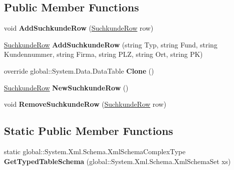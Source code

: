 \subsection*{Public Member Functions}
\begin{DoxyCompactItemize}
\item 
void {\bfseries Add\+Suchkunde\+Row} (\hyperlink{class_products_1_1_data_1_1ds_sage_1_1_suchkunde_row}{Suchkunde\+Row} row)\hypertarget{class_products_1_1_data_1_1ds_sage_1_1_suchkunde_data_table_a9b507c97784ecc77486250055d92f8f5}{}\label{class_products_1_1_data_1_1ds_sage_1_1_suchkunde_data_table_a9b507c97784ecc77486250055d92f8f5}

\item 
\hyperlink{class_products_1_1_data_1_1ds_sage_1_1_suchkunde_row}{Suchkunde\+Row} {\bfseries Add\+Suchkunde\+Row} (string Typ, string Fund, string Kundennummer, string Firma, string P\+LZ, string Ort, string PK)\hypertarget{class_products_1_1_data_1_1ds_sage_1_1_suchkunde_data_table_a2c5311a525c785afbbfb2a7a9ec6fa23}{}\label{class_products_1_1_data_1_1ds_sage_1_1_suchkunde_data_table_a2c5311a525c785afbbfb2a7a9ec6fa23}

\item 
override global\+::\+System.\+Data.\+Data\+Table {\bfseries Clone} ()\hypertarget{class_products_1_1_data_1_1ds_sage_1_1_suchkunde_data_table_aadc5fbbf3329ce71647c599be0a71d3b}{}\label{class_products_1_1_data_1_1ds_sage_1_1_suchkunde_data_table_aadc5fbbf3329ce71647c599be0a71d3b}

\item 
\hyperlink{class_products_1_1_data_1_1ds_sage_1_1_suchkunde_row}{Suchkunde\+Row} {\bfseries New\+Suchkunde\+Row} ()\hypertarget{class_products_1_1_data_1_1ds_sage_1_1_suchkunde_data_table_ab7a006a3b39bb8816c49da96a58dcb94}{}\label{class_products_1_1_data_1_1ds_sage_1_1_suchkunde_data_table_ab7a006a3b39bb8816c49da96a58dcb94}

\item 
void {\bfseries Remove\+Suchkunde\+Row} (\hyperlink{class_products_1_1_data_1_1ds_sage_1_1_suchkunde_row}{Suchkunde\+Row} row)\hypertarget{class_products_1_1_data_1_1ds_sage_1_1_suchkunde_data_table_a1d827abf46611a7f66e0772be5821f53}{}\label{class_products_1_1_data_1_1ds_sage_1_1_suchkunde_data_table_a1d827abf46611a7f66e0772be5821f53}

\end{DoxyCompactItemize}
\subsection*{Static Public Member Functions}
\begin{DoxyCompactItemize}
\item 
static global\+::\+System.\+Xml.\+Schema.\+Xml\+Schema\+Complex\+Type {\bfseries Get\+Typed\+Table\+Schema} (global\+::\+System.\+Xml.\+Schema.\+Xml\+Schema\+Set xs)\hypertarget{class_products_1_1_data_1_1ds_sage_1_1_suchkunde_data_table_a3eb5122a8619ae9b602896131da21396}{}\label{class_products_1_1_data_1_1ds_sage_1_1_suchkunde_data_table_a3eb5122a8619ae9b602896131da21396}

\end{DoxyCompactItemize}
